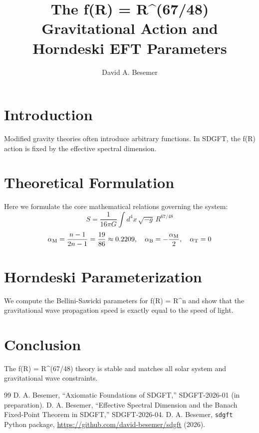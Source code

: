 \documentclass[a4paper,11pt]{article}
\begin{document}
\title{The f(R) = R^(67/48) Gravitational Action and Horndeski EFT Parameters}

\author{David A. Besemer}



\maketitle

\section{Introduction}
Modified gravity theories often introduce arbitrary functions. In SDGFT, the f(R) action is fixed by the effective spectral dimension.

\section{Theoretical Formulation}
Here we formulate the core mathematical relations governing the system:
\begin{equation}
  S = \frac{1}{16\pi G} \int d^4x\,\sqrt{-g}\,R^{67/48}
\end{equation}
\begin{equation}
  \alpha_{\mathrm{M}} = \frac{n-1}{2n-1} = \frac{19}{86} \approx 0.2209, \quad \alpha_{\mathrm{B}} = -\frac{\alpha_{\mathrm{M}}}{2}, \quad \alpha_{\mathrm{T}} = 0
\end{equation}
\section{Horndeski Parameterization}
We compute the Bellini-Sawicki parameters for f(R) = R^n and show that the gravitational wave propagation speed is exactly equal to the speed of light.

\section{Conclusion}
The f(R) = R^(67/48) theory is stable and matches all solar system and gravitational wave constraints.



\begin{thebibliography}{99}
 D. A. Besemer, ``Axiomatic Foundations of SDGFT,'' SDGFT-2026-01 (in preparation).
 D. A. Besemer, ``Effective Spectral Dimension and the Banach Fixed-Point Theorem in SDGFT,'' SDGFT-2026-04.
 D. A. Besemer, \texttt{sdgft} Python package, \url{https://github.com/david-besemer/sdgft} (2026).
\end{thebibliography}
\end{document}
